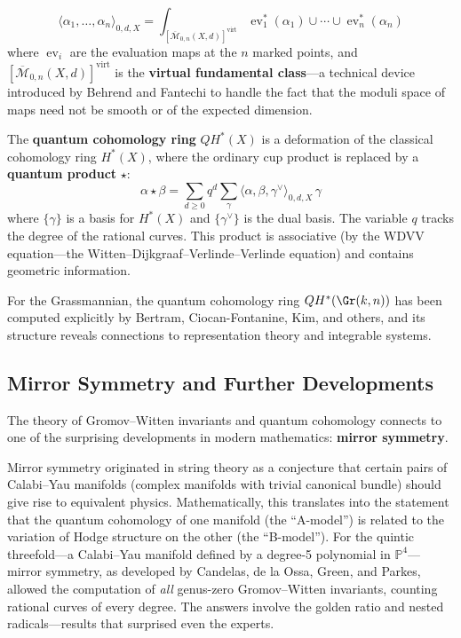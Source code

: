 \[
    \langle \alpha_1, \ldots, \alpha_n \rangle_{0, d, X} = \int_{[\overline{\mathcal{M}}_{0,n}(X,d)]^{\mathrm{virt}}} \operatorname{ev}_1^*(\alpha_1) \cup \cdots \cup \operatorname{ev}_n^*(\alpha_n)
\]
where $\operatorname{ev}_i$ are the evaluation maps at the $n$ marked points, and $[\overline{\mathcal{M}}_{0,n}(X,d)]^{\mathrm{virt}}$ is the \textbf{virtual fundamental class}---a technical device introduced by Behrend and Fantechi to handle the fact that the moduli space of maps need not be smooth or of the expected dimension.

The \textbf{quantum cohomology ring} $QH^*(X)$ is a deformation of the classical cohomology ring $H^*(X)$, where the ordinary cup product is replaced by a \textbf{quantum product} $\star$:
\[
    \alpha \star \beta = \sum_{d \geq 0} q^d \sum_{\gamma} \langle \alpha, \beta, \gamma^{\vee} \rangle_{0,d,X} \, \gamma
\]
where $\{\gamma\}$ is a basis for $H^*(X)$ and $\{\gamma^{\vee}\}$ is the dual basis. The variable $q$ tracks the degree of the rational curves. This product is associative (by the WDVV equation---the Witten--Dijkgraaf--Verlinde--Verlinde equation) and contains geometric information.

For the Grassmannian, the quantum cohomology ring $QH^*(\Gr(k,n))$ has been computed explicitly by Bertram, Ciocan-Fontanine, Kim, and others, and its structure reveals connections to representation theory and integrable systems.

\subsection{Mirror Symmetry and Further Developments}

The theory of Gromov--Witten invariants and quantum cohomology connects to one of the surprising developments in modern mathematics: \textbf{mirror symmetry}.

Mirror symmetry originated in string theory as a conjecture that certain pairs of Calabi--Yau manifolds (complex manifolds with trivial canonical bundle) should give rise to equivalent physics. Mathematically, this translates into the statement that the quantum cohomology of one manifold (the ``A-model'') is related to the variation of Hodge structure on the other (the ``B-model''). For the quintic threefold---a Calabi--Yau manifold defined by a degree-5 polynomial in $\mathbb{P}^4$---mirror symmetry, as developed by Candelas, de la Ossa, Green, and Parkes, allowed the computation of \emph{all} genus-zero Gromov--Witten invariants, counting rational curves of every degree. The answers involve the golden ratio and nested radicals---results that surprised even the experts.

